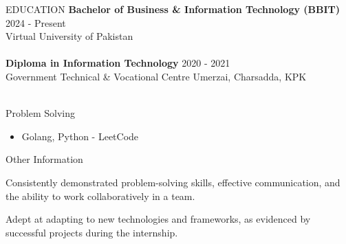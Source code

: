\documentclass{resume}
\begin{document}
\begin{rSection}{EDUCATION}
    {\bf Bachelor of Business \& Information Technology (BBIT)} \hfill {2024 - Present}
    \\
    Virtual University of Pakistan
    \\
    \\
    {\bf Diploma in Information Technology} \hfill {2020 - 2021}
    \\
        Government Technical & Vocational Centre Umerzai, Charsadda, KPK
    \\
    \\
\end{rSection}

\begin{rSection}{Problem Solving}
    \begin{itemize}
        \item Golang, Python - LeetCode \href{https://leetcode.com/csaqibshah/}{}
    \end{itemize}
\end{rSection}

\begin{rSection}{Other Information}
    \item Consistently demonstrated problem-solving skills, effective communication, and the ability to work collaboratively in a team.
    \item Adept at adapting to new technologies and frameworks, as evidenced by successful projects during the internship.
\end{rSection}
\end{document}
